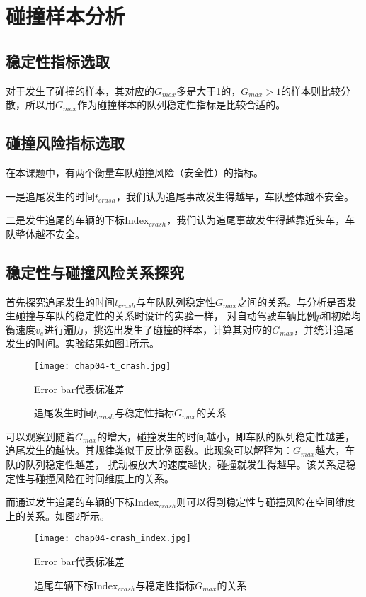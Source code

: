 \section{碰撞样本分析}

\subsection{稳定性指标选取}

对于发生了碰撞的样本，其对应的$G_{max}$多是大于1的，$G_{max} > 1$的样本则比较分散，所以用$G_{max}$作为碰撞样本的队列稳定性指标是比较合适的。

\subsection{碰撞风险指标选取}

在本课题中，有两个衡量车队碰撞风险（安全性）的指标。

一是追尾发生的时间$t_{crash}$，我们认为追尾事故发生得越早，车队整体越不安全。

二是发生追尾的车辆的下标$\mathrm{Index}_{crash}$，我们认为追尾事故发生得越靠近头车，车队整体越不安全。

\subsection{稳定性与碰撞风险关系探究}

首先探究追尾发生的时间$t_{crash}$与车队队列稳定性$G_{max}$之间的关系。与分析是否发生碰撞与车队的稳定性的关系时设计的实验一样，
对自动驾驶车辆比例$p$和初始均衡速度$v_e$进行遍历，挑选出发生了碰撞的样本，计算其对应的$G_{max}$，并统计追尾发生的时间。实验结果如图\ref{fig:chap04-3}所示。

\begin{figure}
    \centering
    \texttt{[image: chap04-t\_crash.jpg]}
    \caption*{Error bar代表标准差}
    \caption{追尾发生时间$t_{crash}$与稳定性指标$G_{max}$的关系}
    \label{fig:chap04-3}
\end{figure} 

可以观察到随着$G_{max}$的增大，碰撞发生的时间越小，即车队的队列稳定性越差，追尾发生的越快。其规律类似于反比例函数。此现象可以解释为：$G_{max}$越大，车队的队列稳定性越差，
扰动被放大的速度越快，碰撞就发生得越早。该关系是稳定性与碰撞风险在时间维度上的关系。

而通过发生追尾的车辆的下标$\mathrm{Index}_{crash}$则可以得到稳定性与碰撞风险在空间维度上的关系。如图\ref{fig:chap04-4}所示。

\begin{figure}
    \centering
    \texttt{[image: chap04-crash\_index.jpg]}
    \caption*{Error bar代表标准差}
    \caption{追尾车辆下标$\mathrm{Index}_{crash}$与稳定性指标$G_{max}$的关系}
    \label{fig:chap04-4}
\end{figure} 

